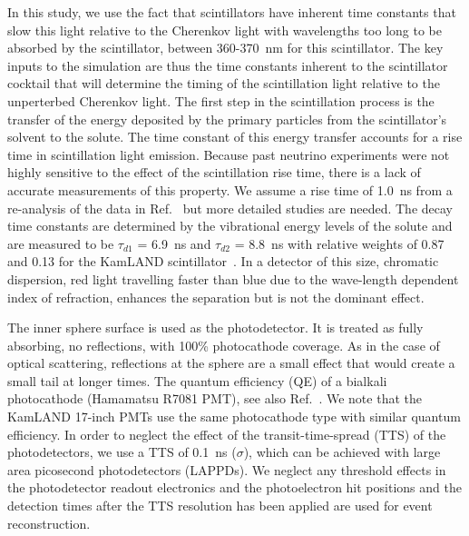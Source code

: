 In this study, we use the fact that scintillators have inherent time constants that slow this light relative to the Cherenkov light with 
wavelengths too long to be absorbed by the scintillator, between 360-370~nm for this scintillator. The key inputs to the simulation are 
thus the time constants inherent to the scintillator cocktail that will determine the timing of the scintillation light relative to the 
unperterbed Cherenkov light. The first step in the scintillation process is the transfer of the energy deposited by the primary particles 
from the scintillator's solvent to the solute. The time constant of this energy transfer accounts for a rise time in scintillation light 
emission. Because past neutrino experiments were not highly sensitive to the effect of the scintillation rise time, there is a lack of 
accurate measurements of this property. We assume a rise time of 1.0~ns from a re-analysis of the data in Ref.~\cite{ChristophThesis} 
but more detailed studies are needed. The decay time constants are determined by the vibrational energy levels of the solute and are 
measured to be $\tau_{d1}$ = 6.9~ns and $\tau_{d2}$ = 8.8~ns with relative weights of 0.87 and 0.13 for the KamLAND 
scintillator~\cite{tajimaThesis}. In a detector of this size, chromatic dispersion, red light travelling faster than blue due to the 
wave-length dependent index of refraction, enhances the separation but is not the dominant effect.

The inner sphere surface is used as the photodetector. It is treated as fully absorbing, no reflections, with 100\% photocathode coverage. As in the case of optical scattering, reflections at the sphere are a small effect that would create a small tail at longer times. The quantum efficiency (QE) of a bialkali photocathode (Hamamatsu R7081 PMT)\cite{Hamamatsu_R7081}, see also Ref.~\cite{dctwo}. We note that the KamLAND 17-inch PMTs use the same photocathode type with similar quantum efficiency. In order to neglect the effect of the transit-time-spread (TTS) of the photodetectors, we use a TTS of 0.1~ns ($\sigma$), which can be achieved with large area picosecond photodetectors
(LAPPDs)\cite{anode_paper,PSEC4_paper,RSI_paper,Vienna2013,Ceramic_paper1,HV_paper,Timing_paper,Incom_paper}. We neglect any threshold effects in the photodetector readout electronics and the photoelectron hit positions and the detection times after the TTS resolution has been applied are used for event reconstruction.
